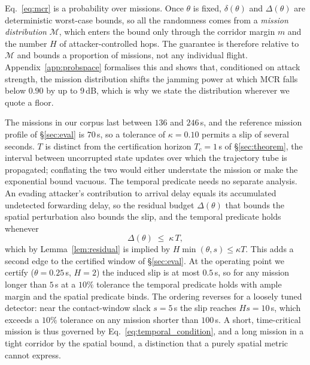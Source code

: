 \documentclass[conference,letterpaper,10pt]{IEEEtran}   %
\begin{document}
\label{sec:probspace}
Eq.~\eqref{eq:mcr} is a probability over missions. Once $\theta$ is fixed,
$\delta(\theta)$ and $\Delta(\theta)$ are deterministic worst-case bounds, so
all the randomness comes from a \emph{mission distribution} $\mathcal{M}$, which
enters the bound only through the corridor margin $m$ and the number $H$ of
attacker-controlled hops. The guarantee is therefore relative to $\mathcal{M}$
and bounds a proportion of missions, not any individual flight.
Appendix~\ref{app:probspace} formalises this and shows that, conditioned on
attack strength, the mission distribution shifts the jamming power at which MCR
falls below $0.90$ by up to $9$\,dB, which is why we state the distribution
wherever we quote a floor.

The missions in our corpus last between $136$ and $246$\,s, and the reference
mission profile of \S\ref{sec:eval} is $70$\,s, so a tolerance of
$\kappa=0.10$ permits a slip of several seconds. $T$ is distinct from the
certification horizon $T_c=1$\,s of \S\ref{sec:theorem}, the interval between
uncorrupted state updates over which the trajectory tube is propagated;
conflating the two would either understate the mission or make the exponential
bound vacuous. The temporal predicate needs no separate analysis. An evading
attacker's contribution to arrival delay equals its accumulated undetected
forwarding delay, so the residual budget $\Delta(\theta)$ that bounds the
spatial perturbation also bounds the slip, and the temporal predicate holds
whenever
\begin{equation}
\label{eq:temporal_condition}
\Delta(\theta)\;\le\;\kappa\,T ,
\end{equation}
which by Lemma~\ref{lem:residual} is implied by $H\min(\theta,s)\le\kappa T$.
This adds a second edge to the certified window of \S\ref{sec:eval}. At the
operating point we certify ($\theta=0.25$\,s, $H=2$) the induced slip is at
most $0.5$\,s, so for any mission longer than $5$\,s at a $10\%$ tolerance the
temporal predicate holds with ample margin and the spatial predicate binds. The
ordering reverses for a loosely tuned detector: near the contact-window slack
$s=5$\,s the slip reaches $Hs=10$\,s, which exceeds a $10\%$ tolerance on any
mission shorter than $100$\,s. A short, time-critical mission is thus governed
by Eq.~\eqref{eq:temporal_condition}, and a long mission in a tight corridor by
the spatial bound, a distinction that a purely spatial metric cannot express.
\end{document}
